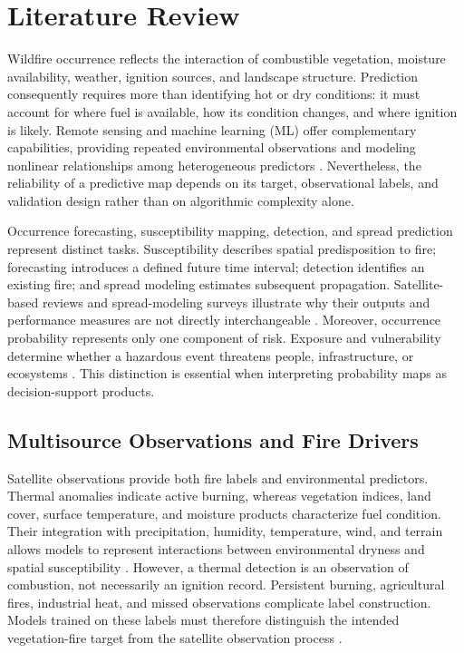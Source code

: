 \documentclass[pdflatex,sn-mathphys-num]{sn-jnl}
\begin{document}
\section{Literature Review}\label{sec:literature_review}

Wildfire occurrence reflects the interaction of combustible vegetation, moisture availability, weather, ignition sources, and landscape structure. Prediction consequently requires more than identifying hot or dry conditions: it must account for where fuel is available, how its condition changes, and where ignition is likely. Remote sensing and machine learning (ML) offer complementary capabilities, providing repeated environmental observations and modeling nonlinear relationships among heterogeneous predictors \cite{xu2025deep,ejaz2025pipeline}. Nevertheless, the reliability of a predictive map depends on its target, observational labels, and validation design rather than on algorithmic complexity alone.

Occurrence forecasting, susceptibility mapping, detection, and spread prediction represent distinct tasks. Susceptibility describes spatial predisposition to fire; forecasting introduces a defined future time interval; detection identifies an existing fire; and spread modeling estimates subsequent propagation. Satellite-based reviews and spread-modeling surveys illustrate why their outputs and performance measures are not directly interchangeable \cite{ghali2023satellite,andrianarivony2024spread}. Moreover, occurrence probability represents only one component of risk. Exposure and vulnerability determine whether a hazardous event threatens people, infrastructure, or ecosystems \cite{dossi2026infrastructure}. This distinction is essential when interpreting probability maps as decision-support products.

\subsection{Multisource Observations and Fire Drivers}

Satellite observations provide both fire labels and environmental predictors. Thermal anomalies indicate active burning, whereas vegetation indices, land cover, surface temperature, and moisture products characterize fuel condition. Their integration with precipitation, humidity, temperature, wind, and terrain allows models to represent interactions between environmental dryness and spatial susceptibility \cite{xu2025deep,mambile2024systematic}. However, a thermal detection is an observation of combustion, not necessarily an ignition record. Persistent burning, agricultural fires, industrial heat, and missed observations complicate label construction. Models trained on these labels must therefore distinguish the intended vegetation-fire target from the satellite observation process \cite{ejaz2025pipeline}.
\end{document}
